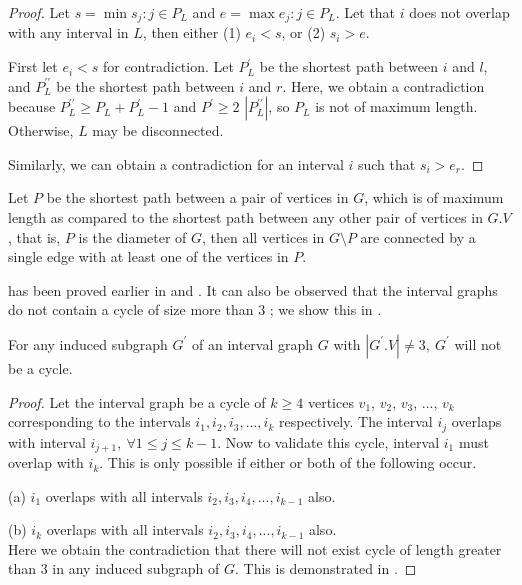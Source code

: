 \begin{proof}
Let $s = \min s_j:j\in P_L$ and $e = \max e_j:j\in P_L$. Let that $i$ does not overlap with any interval in $L$, then either (1) $e_i < s$, or (2) $s_i > e$.

First let $e_i < s$ for contradiction. Let $P_L^\prime$ be the shortest path between $i$ and $l$, and $P_L^{\prime\prime}$ be the shortest path between $i$ and $r$. Here, we obtain a contradiction because $P_L^{\prime\prime} \geq P_L + P_L^\prime-1$ and $P^\prime \geq 2$ $|P_L^{\prime\prime}|$, so $P_L$ is not of maximum length. Otherwise, $L$ may be disconnected.

Similarly, we can obtain a contradiction for an interval $i$ such that $s_i > e_r$.
\end{proof}

\begin{corollary}\label{corollary:NHClosurePIG}
Let $P$ be the shortest path between a pair of vertices in $G$, which is of maximum length as compared to the shortest path between any other pair of vertices in $G.V$, that is, $P$ is the diameter of $G$, then all vertices in $G\setminus P$ are connected by a single edge with at least one of the vertices in $P$.
\end{corollary}

 has been proved earlier in \cite{Kare2019} and \cite{Kamali2019,Kamali2020}. It can also be observed that the interval graphs do not contain a cycle of size more than $3$ \cite{Gilmore1964,Golumbic2004}; we show this in .

\begin{proposition}\label{proposition:IG-no-cycle}
For any induced subgraph $G^\prime$ of an interval graph $G$ with $|G^\prime.V| \neq 3,\ G^\prime$ will not be a cycle.
\end{proposition}

\begin{proof}
Let the interval graph be a cycle of $k \geq 4$ vertices $v_1$, $v_2$, $v_3$, $...$, $v_k$ corresponding to the intervals $i_1, i_2, i_3, ..., i_k$ respectively. The interval $i_j$ overlaps with interval $i_{j+1},\ \forall 1\leq j\leq k-1$. Now to validate this cycle, interval $i_1$ must overlap with $i_k$. This is only possible if either or both of the following occur.

(a) $i_1$ overlaps with all intervals $i_2, i_3, i_4, ..., i_{k-1}$ also.

(b) $i_k$ overlaps with all intervals $i_2, i_3, i_4, ..., i_{k-1}$ also.\\
Here we obtain the contradiction that there will not exist cycle of length greater than $3$ in any induced subgraph of $G$. This is demonstrated in .
\end{proof}

